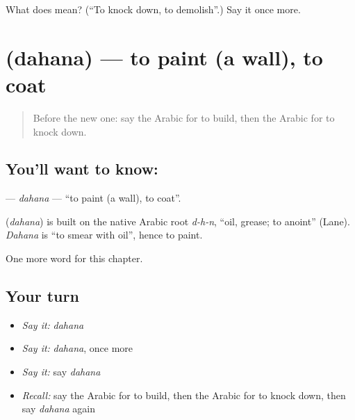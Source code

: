 \begin{tcolorbox}[breakable,colback=teal!4,colframe=teal!35!black,title={Before you move on}]
What does  mean? (\textquotedblleft{}To knock down, to demolish\textquotedblright{}.) Say it once more.
\end{tcolorbox}
\section[\texorpdfstring{\ar{دهن} (dahana)}{دهن (dahana)}]{ (dahana) — to paint (a wall), to coat}

\label{lesson:AR-C166-dahana}



\begin{quote}
Before the new one: say the Arabic for to build, then the Arabic for to knock down.
\end{quote}

\subsection*{You'll want to know: }
\textbf{} — \emph{dahana} — \textquotedblleft{}to paint (a wall), to coat\textquotedblright{}.

\begin{cousinweb}
\textbf{} (\emph{dahana}) is built on the native Arabic root \emph{d-h-n}, \textquotedblleft{}oil, grease; to anoint\textquotedblright{} (Lane). \emph{Dahana} is \textquotedblleft{}to smear with oil\textquotedblright{}, hence to paint.
\end{cousinweb}

\begin{grammarlens}[title={What you've built}]
One more word for this chapter.
\end{grammarlens}

\subsection*{Your turn}
\begin{itemize}
\raggedright
  \item \emph{Say it:} \emph{dahana}
  \item \emph{Say it:} \emph{dahana}, once more
  \item \emph{Say it:} say \emph{dahana}
  \item \emph{Recall:} say the Arabic for to build, then the Arabic for to knock down, then say \emph{dahana} again
\end{itemize}


